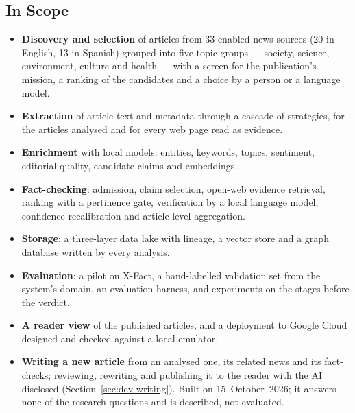 
\subsection{In Scope}

\begin{itemize}
    \item \textbf{Discovery and selection} of articles from 33 enabled
    news sources (20 in English, 13 in Spanish) grouped into five topic
    groups --- society, science, environment, culture and health ---
    with a screen for the publication's mission, a ranking of the
    candidates and a choice by a person or a language model.
    \item \textbf{Extraction} of article text and metadata through a
    cascade of strategies, for the articles analysed and for every web
    page read as evidence.
    \item \textbf{Enrichment} with local models: entities, keywords,
    topics, sentiment, editorial quality, candidate claims and
    embeddings.
    \item \textbf{Fact-checking}: admission, claim selection, open-web
    evidence retrieval, ranking with a pertinence gate, verification by
    a local language model, confidence recalibration and article-level
    aggregation.
    \item \textbf{Storage}: a three-layer data lake with lineage, a
    vector store and a graph database written by every analysis.
    \item \textbf{Evaluation}: a pilot on X-Fact, a hand-labelled
    validation set from the system's domain, an evaluation harness, and
    experiments on the stages before the verdict.
    \item \textbf{A reader view} of the published articles, and a
    deployment to Google Cloud designed and checked against a local
    emulator.
    \item \textbf{Writing a new article} from an analysed one, its
    related news and its fact-checks; reviewing, rewriting and
    publishing it to the reader with the AI disclosed
    (Section~\ref{sec:dev-writing}). Built on 15~October~2026; it
    answers none of the research questions and is described, not
    evaluated.
\end{itemize}
